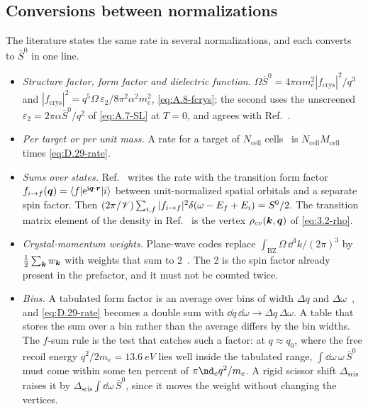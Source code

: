 \subsection{Conversions between normalizations}

The literature states the same rate in several normalizations, and each converts to $\bar S^0$ in one line.
\begin{itemize}
\item \emph{Structure factor, form factor and dielectric function.} $\Omega\bar S^0 = 4\pi\alpha m_e^2|f_{\mathrm{crys}}|^2/q^3$ and $|f_{\mathrm{crys}}|^2 = q^5\Omega\,\varepsilon_2/8\pi^2\alpha^2m_e^2$, \cref{eq:A.8-fcrys}; the second uses the unscreened $\varepsilon_2 = 2\pi\alpha\bar S^0/q^2$ of \cref{eq:A.7-SL} at $T = 0$, and agrees with Ref.~\cite[Eq.~(16)]{knapen2021dark}.
\item \emph{Per target or per unit mass.} A rate for a target of $N_{\mathrm{cell}}$ cells~\cites[Eq.~(3.13)]{essig2016direct}[Eq.~(36)]{catena2021crystal} is $N_{\mathrm{cell}}M_{\mathrm{cell}}$ times \cref{eq:D.29-rate}.
\item \emph{Sums over states.} Ref.~\cite[Eqs.~(3.6) and (3.12)]{griffin2021extended} writes the rate with the transition form factor $f_{i\to f}(\bm{q}) = \langle f|\mathrm{e}^{\mathrm{i}\bm{q}\cdot\bm{r}}|i\rangle$ between unit-normalized spatial orbitals and a separate spin factor. Then $(2\pi/\mathscr{V})\sum_{i,f}|f_{i\to f}|^2\delta(\omega - E_f + E_i) = S^0/2$. The transition matrix element of the density in Ref.~\cite[Eqs.~(11) and (17)]{trickle2023exceed} is the vertex $\rho_{cv}(\bm{k},\bm{q})$ of \cref{eq:3.2-rho}.
\item \emph{Crystal-momentum weights.} Plane-wave codes replace $\int_{\mathrm{BZ}}\Omega\,\dd^3k/(2\pi)^3$ by $\frac12\sum_{\bm{k}}w_{\bm{k}}$ with weights that sum to 2~\cite[Eq.~(4.2)]{essig2016direct}. The 2 is the spin factor already present in the prefactor, and it must not be counted twice.
\item \emph{Bins.} A tabulated form factor is an average over bins of width $\Delta q$ and $\Delta\omega$~\cite[Eq.~(4.1)]{essig2016direct}, and \cref{eq:D.29-rate} becomes a double sum with $\dd q\,\dd\omega \to \Delta q\,\Delta\omega$. A table that stores the sum over a bin rather than the average differs by the bin widths. The $f$-sum rule is the test that catches such a factor: at $q \approx q_0$, where the free recoil energy $q^2/2m_e = \SI{13.6}{eV}$ lies well inside the tabulated range, $\int\dd\omega\,\omega\,\bar S^0$ must come within some ten percent of $\pi\nd_eq^2/m_e$. A rigid scissor shift $\Delta_{\mathrm{scis}}$ raises it by $\Delta_{\mathrm{scis}}\int\dd\omega\,\bar S^0$, since it moves the weight without changing the vertices.
\end{itemize}

